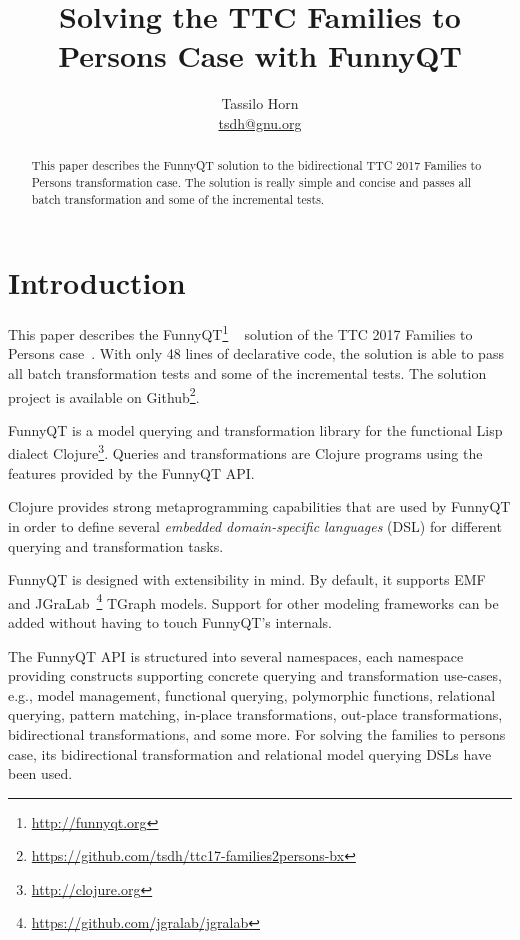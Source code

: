 \documentclass[a4paper]{article}
\title{Solving the TTC Families to Persons Case with FunnyQT}
\author{Tassilo Horn\\ \href{mailto:tsdh@gnu.org}{tsdh@gnu.org}}
\begin{document}
\maketitle

\begin{abstract}
  This paper describes the FunnyQT solution to the bidirectional TTC 2017
  Families to Persons transformation case.  The solution is really simple and
  concise and passes all batch transformation and some of the incremental
  tests.
\end{abstract}


\section{Introduction}
\label{sec:introduction}

This paper describes the FunnyQT\footnote{\url{http://funnyqt.org}}
~\cite{diss,funnyqt-icgt15} solution of the TTC 2017 Families to Persons
case~\cite{f2p-case-desc}.  With only 48 lines of declarative code, the
solution is able to pass all batch transformation tests and some of the
incremental tests.  The solution project is available on
Github\footnote{\url{https://github.com/tsdh/ttc17-families2persons-bx}}.


FunnyQT is a model querying and transformation library for the functional Lisp
dialect Clojure\footnote{\url{http://clojure.org}}.  Queries and
transformations are Clojure programs using the features provided by the FunnyQT
API.

Clojure provides strong metaprogramming capabilities that are used by FunnyQT
in order to define several \emph{embedded domain-specific languages} (DSL) for
different querying and transformation tasks.

FunnyQT is designed with extensibility in mind.  By default, it supports
EMF~\cite{Steinberg2008EEM} and
JGraLab~\footnote{\url{https://github.com/jgralab/jgralab}} TGraph models.
Support for other modeling frameworks can be added without having to touch
FunnyQT's internals.

The FunnyQT API is structured into several namespaces, each namespace providing
constructs supporting concrete querying and transformation use-cases, e.g.,
model management, functional querying, polymorphic functions, relational
querying, pattern matching, in-place transformations, out-place
transformations, bidirectional transformations, and some more.  For solving the
families to persons case, its bidirectional transformation and relational model
querying DSLs have been used.
\end{document}
